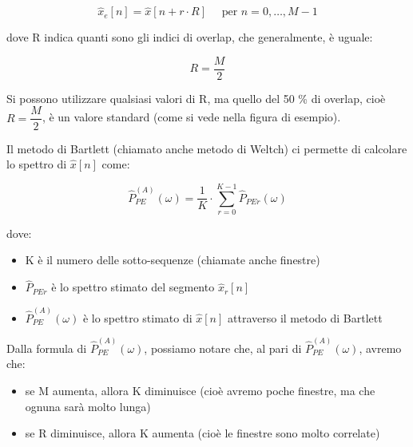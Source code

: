 {
    \Large 
    \begin{equation}
        \hat{x}_{e} \left[ n\right] 
        = 
        \hat{x} \left[ n + r \cdot R\right]
        \quad 
        \text{ per }
        n = 0, \dots, M - 1
    \end{equation}
}

dove R indica quanti sono gli indici di overlap, che generalmente, è uguale: 

{
    \Large 
    \begin{equation}
        R = \dfrac{M}{2}
    \end{equation}
}

Si possono utilizzare qualsiasi valori di R, ma quello del 50 \% di overlap, cioè $R = \dfrac{M}{2}$, è un valore standard (come si vede nella figura di esempio). \newline 

Il metodo di Bartlett (chiamato anche metodo di Weltch) ci permette di calcolare lo spettro di $\hat{x} \left[ n\right]$ come: 

{
    \Large 
    \begin{equation}
        \hat{P}_{PE}^{\left(A\right)} \left(\omega\right) 
        = 
        \dfrac{1}{K} 
        \cdot 
        \sum_{r = 0}^{K - 1}
        \hat{P}_{PEr} \left(\omega\right)
    \end{equation}
}

dove: 

\begin{itemize}
    \item K è il numero delle sotto-sequenze (chiamate anche finestre) 
    \item $\hat{P}_{PEr}$ è lo spettro stimato del segmento $\hat{x}_{r} \left[ n\right]$
    \item $\hat{P}_{PE}^{\left(A\right)} \left(\omega\right)$ è lo spettro stimato di $\hat{x} \left[ n\right]$ attraverso il metodo di Bartlett 
\end{itemize}

\newpage 

Dalla formula di $\hat{P}_{PE}^{\left(A\right)} \left(\omega\right)$, possiamo notare che, al pari di $\hat{P}_{PE}^{\left(A\right)} \left(\omega\right)$, avremo che: 

\begin{itemize}
    \item se M aumenta, allora K diminuisce (cioè avremo poche finestre, ma che ognuna sarà molto lunga)
    \item se R diminuisce, allora K aumenta (cioè le finestre sono molto correlate)
\end{itemize}

